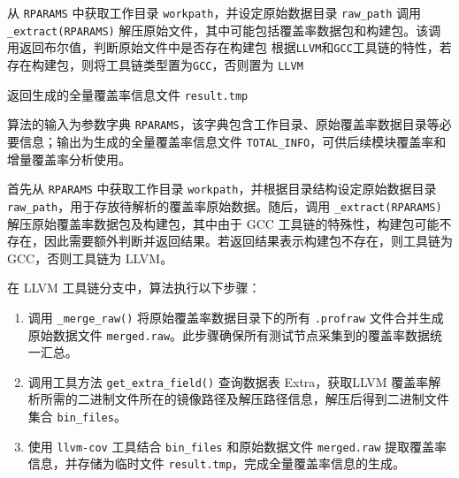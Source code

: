 \begin{algorithm}[ht]
\caption{细粒度分析-解析任务层-全量覆盖率分析算法}
\label{algo:5.7}

从 \texttt{RPARAMS} 中获取工作目录 \texttt{workpath}，并设定原始数据目录 \texttt{raw\_path}\;
调用 \texttt{\_extract(RPARAMS)} 解压原始文件，其中可能包括覆盖率数据包和构建包。该调用返回布尔值，判断原始文件中是否存在构建包\;
根据\texttt{LLVM}和\texttt{GCC}工具链的特性，若存在构建包，则将工具链类型置为\texttt{GCC}，否则置为 \texttt{LLVM}\;

返回生成的全量覆盖率信息文件 \texttt{result.tmp} \;
\end{algorithm}

算法的输入为参数字典 \texttt{RPARAMS}，该字典包含工作目录、原始覆盖率数据目录等必要信息；输出为生成的全量覆盖率信息文件 \texttt{TOTAL\_INFO}，可供后续模块覆盖率和增量覆盖率分析使用。

首先从 \texttt{RPARAMS} 中获取工作目录 \texttt{workpath}，并根据目录结构设定原始数据目录 \texttt{raw\_path}，用于存放待解析的覆盖率原始数据。随后，调用 \texttt{\_extract(RPARAMS)} 解压原始覆盖率数据包及构建包，其中由于 GCC 工具链的特殊性，构建包可能不存在，因此需要额外判断并返回结果。若返回结果表示构建包不存在，则工具链为 GCC，否则工具链为 LLVM。

在 LLVM 工具链分支中，算法执行以下步骤：
\begin{enumerate}
    \item 调用 \texttt{\_merge\_raw()} 将原始覆盖率数据目录下的所有 \texttt{.profraw} 文件合并生成原始数据文件 \texttt{merged.raw}。此步骤确保所有测试节点采集到的覆盖率数据统一汇总。
    \item 调用工具方法 \texttt{get\_extra\_field()} 查询数据表 Extra，获取LLVM 覆盖率解析所需的二进制文件所在的镜像路径及解压路径信息，解压后得到二进制文件集合 \texttt{bin\_files}。\
    \item 使用 \texttt{llvm-cov} 工具结合 \texttt{bin\_files} 和原始数据文件 \texttt{merged.raw} 提取覆盖率信息，并存储为临时文件 \texttt{result.tmp}，完成全量覆盖率信息的生成。
\end{enumerate}

